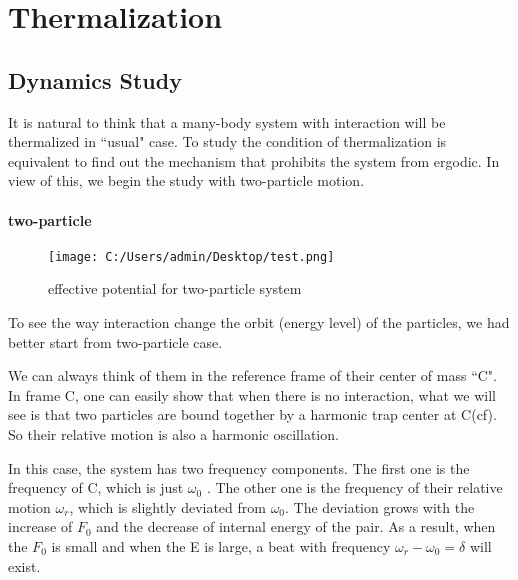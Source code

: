 \documentclass[a4paper,onecolumn,12pt]{article}
\begin{document}
\section{Thermalization}
\subsection{Dynamics Study}
It is natural to think that a many-body system with interaction will be thermalized in ``usual" case. To study the condition of thermalization is equivalent to find out the mechanism that prohibits the system from ergodic. In view of this, we begin the study with two-particle motion. 
\paragraph{two-particle}

\begin{figure}[hbtp]
\centering
\texttt{[image: C:/Users/admin/Desktop/test.png]}
\caption{effective potential for two-particle system}
\label{fig:thermalization2}
\end{figure}

To see the way interaction change the orbit (energy level) of the particles, we had better start from two-particle case.

We can always think of them in the reference frame of their center of mass ``C". In frame C, one can easily show that when there is no interaction, what we will see is that two particles are bound together by a harmonic trap center at C(cf). So their relative motion is also a harmonic oscillation. 

In this case, the system has two frequency components. The first one is the frequency of C, which is just $\omega_0$ . The other one is the frequency of their relative motion $\omega_r$, which is slightly deviated from $\omega_0$. The deviation grows with the increase of $F_0$ and the decrease of internal energy of the pair. As a result, when the $F_0$ is small and when the E is large, a beat with frequency $\omega_r-\omega_0=\delta$ will exist. 
\end{document}
